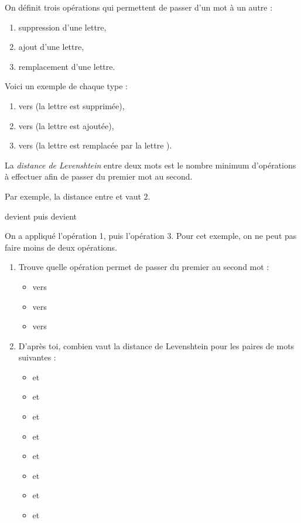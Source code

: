 \documentclass[class=report,crop=false, 12pt]{standalone}
\begin{document}
\begin{activite}

On définit trois opérations qui permettent de passer d'un mot à un autre :
\begin{enumerate}
  \item suppression d'une lettre,
  \item ajout d'une lettre, 
  \item remplacement d'une lettre. 
\end{enumerate}
Voici un exemple de chaque type :
\begin{enumerate}
  \item {} vers  (la lettre  est supprimée), 
  \item {} vers  (la lettre  est ajoutée), 
  \item {} vers  (la lettre  est remplacée par la lettre ). 
\end{enumerate}

La \emph{distance de Levenshtein} entre deux mots est le nombre minimum d'opérations à effectuer afin de passer du premier mot au second.

Par exemple, la distance entre  et  vaut $2$.

\centerline{ \quad devient \quad {} \quad puis devient \quad {}}

On a appliqué l'opération 1, puis l'opération 3. Pour cet exemple, on ne peut pas faire moins de deux opérations.

\begin{enumerate}
  \item Trouve quelle opération permet de passer du premier au second mot :
  \begin{itemize}
    \item {} vers 
    \item {} vers 
    \item {} vers  
  \end{itemize}   

 
  \item D'après toi, combien vaut la distance de Levenshtein pour les paires de mots suivantes : 
  \begin{itemize}
    \item {} et 
    \item {} et 
    \item {} et      
    \item {} et  
    \item {} et     
    \item {} et 
    \item {} et   
    \item {} et         
  \end{itemize}  

  
\end{enumerate}

\end{activite}
\end{document}
